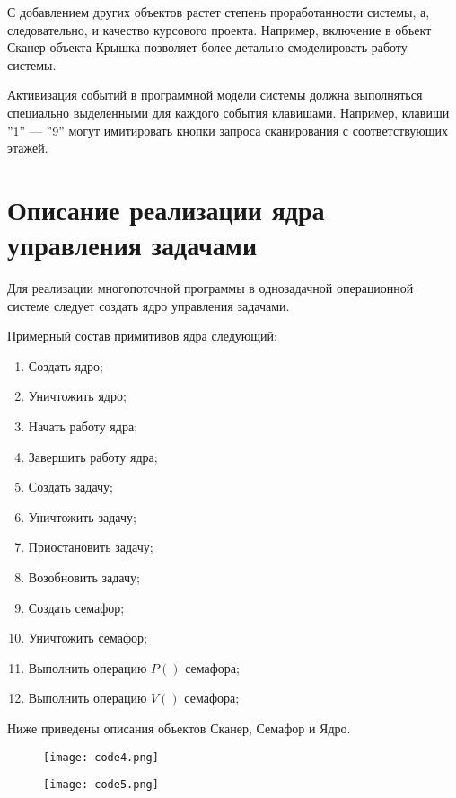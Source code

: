\documentclass[12pt]{article}
\let\oldsection\section
\renewcommand{\section}[1]{
    \oldsection{#1}
    \setcounter{table}{0}
    \setcounter{figure}{0}
}
\begin{document}
    С добавлением других объектов растет степень проработанности системы, а, следовательно, и качество курсового проекта. Например, включение в объект Сканер объекта Крышка позволяет более детально смоделировать работу системы.

    Активизация событий в программной модели системы должна выполняться специально выделенными для каждого события клавишами. Например, клавиши ''1'' --- ''9'' могут имитировать кнопки запроса сканирования с соответствующих этажей.

    \section{Описание реализации ядра управления задачами}

    Для реализации многопоточной программы в однозадачной операционной системе следует создать ядро управления задачами.

    Примерный состав примитивов ядра следующий:

    \begin{enumerate}
        \item Создать ядро;
        \item Уничтожить ядро;
        \item Начать работу ядра;
        \item Завершить работу ядра;
        \item Создать задачу;
        \item Уничтожить задачу;
        \item Приостановить задачу;
        \item Возобновить задачу;
        \item Создать семафор;
        \item Уничтожить семафор;
        \item Выполнить операцию $P ()$ семафора;
        \item Выполнить операцию $V ()$ семафора;
    \end{enumerate}

    \newpage

    Ниже приведены описания объектов Сканер, Семафор и Ядро.

    \begin{figure}[h]
        \texttt{[image: code4.png]}
    \end{figure}

    \begin{figure}[h]
        \texttt{[image: code5.png]}
    \end{figure}
\end{document}
